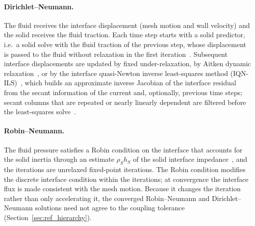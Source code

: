 \paragraph{Dirichlet--Neumann.}
The fluid receives the interface displacement (mesh motion and wall velocity) and the solid receives the fluid traction.
Each time step starts with a solid predictor, i.e.\ a solid solve with the fluid traction of the previous step, whose displacement is passed to the fluid without relaxation in the first iteration~\citep{Tukovic2018}.
Subsequent interface displacements are updated by fixed under-relaxation, by Aitken dynamic relaxation~\citep{kuttler2008fixed}, or by the interface quasi-Newton inverse least-squares method (IQN-ILS)~\citep{Degroote2009, Degroote2013}, which builds an approximate inverse Jacobian of the interface residual from the secant information of the current and, optionally, previous time steps; secant columns that are repeated or nearly linearly dependent are filtered before the least-squares solve~\citep{Haelterman2016}.

\paragraph{Robin--Neumann.}
The fluid pressure satisfies a Robin condition on the interface that accounts for the solid inertia through an estimate $\rho_S h_S$ of the solid interface impedance~\citep{BadiaNobile2008, Tukovic2018b}, and the iterations are unrelaxed fixed-point iterations.
The Robin condition modifies the discrete interface condition within the iterations; at convergence the interface flux is made consistent with the mesh motion.
Because it changes the iteration rather than only accelerating it, the converged Robin--Neumann and Dirichlet--Neumann solutions need not agree to the coupling tolerance (Section~\ref{sec:ref_hierarchy}).

